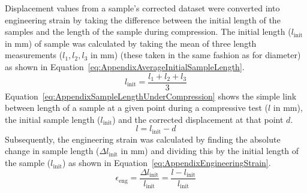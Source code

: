 Displacement values from a sample's corrected dataset were converted into
 engineering strain by taking the difference between the initial length of 
 the samples and the length of the sample during compression.
The initial length (\(l_{\mathrm{init}}\) in \unit{\milli\metre}) of sample 
 was calculated by taking the mean of three length measurements 
 (\(l_{1},l_{2},l_{3}\) in \unit{\milli\metre}) (these taken in the same 
 fashion as for diameter) as shown in Equation~\ref{eq:AppendixAverageInitialSampleLength}.
\begin{equation}\label{eq:AppendixAverageInitialSampleLength}
    l_{\mathrm{init}} = \frac{l_{1}+l_{2}+l_{3}}{3}
\end{equation}
Equation~\ref{eq:AppendixSampleLengthUnderCompression} shows the simple link between
 length of a sample at a given point during a compressive test (\(l\) in
 \unit{\milli\metre}), the initial sample length (\(l_{\mathrm{init}}\)) and the
 corrected displacement at that point \(d\).
\begin{equation}\label{eq:AppendixSampleLengthUnderCompression}
    l = l_{\mathrm{init}}-d
\end{equation}
Subsequently, the engineering strain was calculated by finding the 
 absolute change in sample length (\(\Delta l_{\mathrm{init}}\) in 
 \unit{\milli\metre}) and dividing this by the initial length of the
 sample (\(l_{\mathrm{init}}\)) as shown in 
 Equation~\ref{eq:AppendixEngineeringStrain}.
\begin{equation}\label{eq:AppendixEngineeringStrain}
    \epsilon _{\mathrm{eng}}=\frac{\Delta l_{\mathrm{init}}}{l_{\mathrm{init}}}=\frac{l-l_{\mathrm{init}}}{l_{\mathrm{init}}}
\end{equation}

